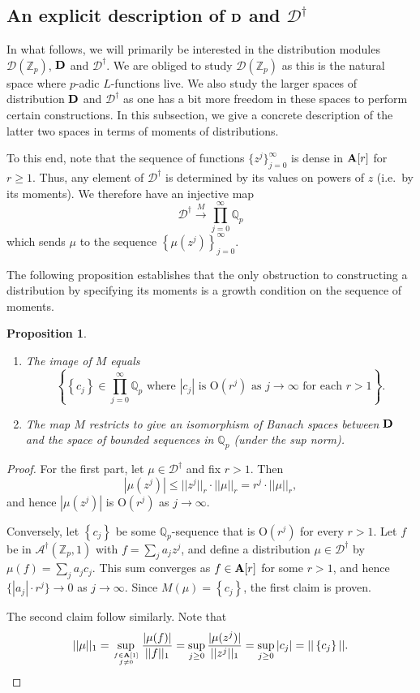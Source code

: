 \documentclass{amsart}
\theoremstyle{plain}
\newtheorem{prop}[thm]{Proposition}
\theoremstyle{definition}
\newcommand{\A}{{\mathcal A}}
\newcommand{\bA}{{\bf A}}
\newcommand{\D}{{\mathcal D}}
\newcommand{\bD}{{\bf D}}
\newcommand{\OO}{\text{O}}
\newcommand{\Z}{{\mathbb Z}}
\newcommand{\Q}{{\mathbb Q}}
\newcommand{\Zp}{\Z_p}
\newcommand{\Qp}{\Q_p}
\newcommand{\maps}{\rightarrow}
\newcommand{\lra}{\longrightarrow}
\newcommand{\Arigv}[1]{\bA[#1]}
\newcommand{\Drig}{\bD}
\newcommand{\Aocv}[1]{\A^\dag(\Zp,#1)}
\newcommand{\Aoc}{\Aocv{1}}
\newcommand{\Doc}{\D^\dag}
\newcommand{\Dla}{\D(\Zp)}
\begin{document}
\subsection{An explicit description of $\Drig$ and $\Doc$}

In what follows, we will primarily be interested in the distribution modules
$\Dla$, $\Drig$ and $\Doc$. We are obliged to study $\Dla$ as this is the natural space where $p$-adic $L$-functions live. We also study the larger spaces of distribution $\Drig$ and $\Doc$ as one has a bit more freedom in these spaces to perform certain constructions. In this subsection, we give a concrete description of the latter two spaces in terms of moments of distributions.

To this end, note that the sequence of functions $\{z^j\}_{j=0}^\infty$ is dense in $\Arigv{r}$ for $r \geq 1$.  Thus, any element of $\Doc$ is determined by its values on powers of $z$ (i.e.\ by its moments).  We therefore have an injective map
$$
\Doc \stackrel{M}{\lra} \prod_{j=0}^\infty \Qp
$$
which sends $\mu$ to the sequence
$\left\{ \mu(z^j) \right\}_{j =0}^\infty$.  

The following proposition establishes that the only obstruction to constructing a distribution by specifying its moments is a growth condition on the sequence of moments.

\begin{prop}
\label{prop:moments}~
\begin{enumerate}
\item The image of $M$ equals
$$
\left\{ \left\{c_j\right\} \in \prod_{j=0}^\infty \Qp \text{~where~}
|c_j| \text{~is~} \OO(r^j) \text{~as~} j \maps \infty
\text{~for~each~} r>1 \right\}.
$$
\item The map $M$ restricts to give an isomorphism of Banach spaces between $\Drig$ and the space of bounded sequences in $\Qp$ (under the sup norm).
\end{enumerate}
\end{prop}

\begin{proof}
For the first part, let $\mu \in \Doc$ and fix $r>1$.  Then
$$
|\mu(z^j)| \leq ||z^j||_r \cdot ||\mu||_r = r^j \cdot ||\mu||_r,
$$
and hence $|\mu(z^j)|$ is $\OO(r^j)$ as $j \maps \infty$.

Conversely, let $\left\{c_j\right\} $ be some $\Qp$-sequence that is $\OO(r^j)$ for every $r>1$.  Let $f$ be in $\Aoc$ with $f = \sum_j a_j z^j$, and define a distribution $\mu \in \Doc$ by $\mu(f) = \sum_j a_j c_j$.  This sum converges as $f \in \Arigv{r}$ for some $r>1$, and hence $\{ |a_j| \cdot r^j \} \maps 0$ as $j \maps \infty$. Since $M(\mu) = \left\{c_j\right\} $, the first claim is proven.

The second claim follow similarly.  Note that
$$
||\mu||_1 = \sup_{\genfrac{}{}{0pt}{}{f \in \Arigv{1}}{f \neq 0}}
\frac{|\mu(f)|}{||f||_1}
          = \sup_{j \geq 0} \frac{|\mu(z^j)|}{||z^j||_1} = \sup_{j \geq 0}
|c_j| = || \left\{c_j\right\} ||.
$$
\end{proof}
\end{document}
